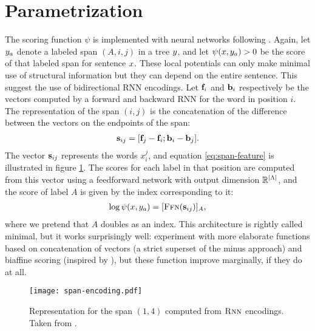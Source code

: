 \section{Parametrization}
  The scoring function $\psi$ is implemented with neural networks following \citet{stern2017minimal}. Again, let $y_a$ denote a labeled span $(A, i, j)$ in a tree $y$, and let $\psi(x, y_a) > 0$ be the score of that labeled span for sentence $x$. These local potentials can only make minimal use of structural information but they can depend on the entire sentence. This suggest the use of bidirectional RNN encodings. Let $\mathbf{f}_i$ and $\mathbf{b}_i$ respectively be the vectors computed by a forward and backward RNN for the word in position $i$. The representation of the span $(i, j)$ is the concatenation of the difference between the vectors on the endpoints of the span:
  \begin{align}
    \label{eq:span-feature}
    \mathbf{s}_{ij} = [\mathbf{f}_j - \mathbf{f}_i; \mathbf{b}_i - \mathbf{b}_j].
  \end{align}
  The vector $\mathbf{s}_{ij}$ represents the words $x_i^j$, and equation \ref{eq:span-feature} is illustrated in figure \ref{fig:span-feature}. The scores for each label in that position are computed from this vector using a feedforward network with output dimension $\mathbb{R}^{\lvert \Lambda \rvert}$, and the score of label $A$ is given by the index corresponding to it:
  \begin{align}
    \label{eq:potential-function}
    \log \psi(x, y_a) = [ \textsc{Ffn}( \mathbf{s}_{ij} ) ]_{A},
  \end{align}
  where we pretend that $A$ doubles as an index. This architecture is rightly called minimal, but it works surprisingly well: \citet{stern2017minimal} experiment with more elaborate functions based on concatenation of vectors (a strict superset of the minus approach) and biaffine scoring (inspired by \citet{dozat2016deep}), but these function improve marginally, if they do at all.

  \begin{figure}
    \texttt{[image: span-encoding.pdf]}
    \caption{Representation for the span $(1, 4)$ computed from $\textsc{Rnn}$ encodings. Taken from \citet{stern2018analyis}.}
    \label{fig:span-feature}
  \end{figure}

